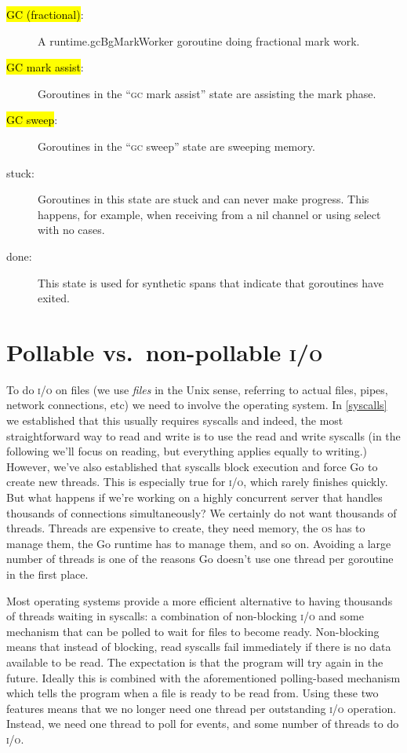 \documentclass[10pt,letterpaper,oneside,openany,english]{memoir}
\newcommand{\code}[1]{{\ttfamily\mbox{#1}}}
\newcommand{\traceState}[2]{{\sethlcolor{#2}\hl{#1}}}
\begin{document}
\begin{description}
\item[\traceState{GC (fractional)}{stateGC}:] A \code{runtime.gcBgMarkWorker} goroutine doing fractional mark work.

\item[\traceState{GC mark assist}{stateGC}:] Goroutines in the \enquote{\textsc{gc} mark assist} state are assisting the mark phase.

\item[\traceState{GC sweep}{stateGC}:] Goroutines in the \enquote{\textsc{gc} sweep} state are sweeping memory.

\item[stuck:] Goroutines in this state are stuck and can never make progress.
  This happens, for example, when receiving from a nil channel or using \code{select} with no cases.

\item[done:] This state is used for synthetic spans that indicate that goroutines have exited.

\end{description}

\section{Pollable vs.\ non-pollable \textsc{i/o}}\label{netpoller}

To do \textsc{i/o} on files (we use \emph{files} in the Unix sense, referring to actual files, pipes, network connections, etc) we need to involve the operating system.
In \cref{syscalls} we established that this usually requires syscalls and indeed, the most straightforward way to read and write is to use the \code{read} and \code{write} syscalls (in the following we'll focus on reading, but everything applies equally to writing.)
However, we've also established that syscalls block execution and force Go to create new threads.
This is especially true for \textsc{i/o}, which rarely finishes quickly.
But what happens if we're working on a highly concurrent server that handles thousands of connections simultaneously?
We certainly do not want thousands of threads.
Threads are expensive to create, they need memory, the \textsc{os} has to manage them, the Go runtime has to manage them, and so on.
Avoiding a large number of threads is one of the reasons Go doesn't use one thread per goroutine in the first place.

Most operating systems provide a more efficient alternative to having thousands of threads waiting in syscalls:
a combination of non-blocking \textsc{i/o} and some mechanism that can be polled to wait for files to become ready.
Non-blocking means that instead of blocking, read syscalls fail immediately if there is no data available to be read.
The expectation is that the program will try again in the future.
Ideally this is combined with the aforementioned polling-based mechanism which tells the program when a file is ready to be read from.
Using these two features means that we no longer need one thread per outstanding \textsc{i/o} operation. Instead, we need one thread to poll for events, and some number of threads to do \textsc{i/o}.
\end{document}

